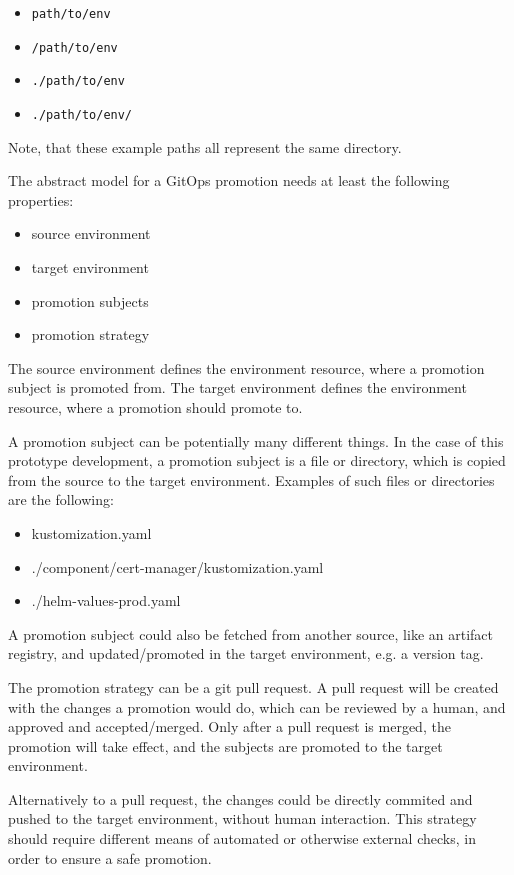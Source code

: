 \begin{itemize}
	\item \lstinline|path/to/env|
	\item \lstinline|/path/to/env|
	\item \lstinline|./path/to/env|
	\item \lstinline|./path/to/env/|
\end{itemize}

Note, that these example paths all represent the same directory.

The abstract model for a GitOps promotion needs at least the following properties:

\begin{itemize}
	\item source environment
	\item target environment
	\item promotion subjects
	\item promotion strategy
\end{itemize}

The source environment defines the environment resource,
where a promotion subject is promoted from.
The target environment defines the environment resource,
where a promotion should promote to.

A promotion subject can be potentially many different things.
In the case of this prototype development,
a promotion subject is a file or directory,
which is copied from the source to the target environment.
Examples of such files or directories are the following:

\begin{itemize}
	\item kustomization.yaml
	\item ./component/cert-manager/kustomization.yaml
	\item ./helm-values-prod.yaml
\end{itemize}

A promotion subject could also be fetched from another source,
like an artifact registry,
and updated/promoted in the target environment,
e.g. a version tag.

The promotion strategy can be a git pull request.
A pull request will be created with the changes a promotion would do, 
which can be reviewed by a human,
and approved and accepted/merged.
Only after a pull request is merged,
the promotion will take effect, and the subjects are promoted to the target environment.

Alternatively to a pull request, the changes could be directly
commited and pushed to the target environment,
without human interaction. This strategy should require different means
of automated or otherwise external checks, in order to ensure a safe promotion.

